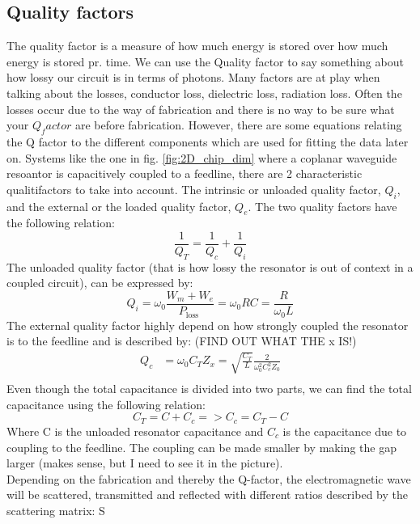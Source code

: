         \subsection{Quality factors}
        The quality factor is a measure of how much energy is stored over how much energy is stored pr. time. We can use the Quality factor to say something about how lossy our circuit is in terms of photons. Many factors are at play when talking about the losses, conductor loss, dielectric loss, radiation loss. Often the losses occur due to the way of fabrication and there is no way to be sure what your $Q_factor$ are before fabrication. However, there are some equations relating the Q factor to the different components which are used for fitting the data later on. Systems like the one in fig. \ref{fig:2D_chip_dim} where a coplanar waveguide resoantor is capacitively coupled to a feedline, there are 2 characteristic qualitifactors to take into account. The intrinsic or unloaded quality factor, $Q_i$, and the external or the loaded quality factor, $Q_e$. The two quality factors have the following relation:
        \begin{equation}
            \frac{1}{Q_{T}} = \frac{1}{Q_{c}} + \frac{1}{Q_{i}} 
        \end{equation}
        The unloaded quality factor (that is how lossy the resonator is out of context in a coupled circuit), can be expressed by: 
        \begin{equation}
            Q_i=\omega_0 \frac{W_m+W_e}{P_{\text {loss }}}=\omega_0 R C=\frac{R}{\omega_0 L}
        \end{equation}
        The external quality factor highly depend on how strongly coupled the resonator is to the feedline and is described by: (FIND OUT WHAT THE x IS!)
        \begin{equation}
            \begin{aligned}
                Q_c &= \omega_0 C_T Z_x=\sqrt{\frac{C_T}{L}} \frac{2}{\omega_0^2 C_c^2 Z_0}\\    
            \end{aligned} 
        \end{equation}\label{eq:Qc}
        Even though the total capacitance is divided into two parts, we can find the total capacitance using the following relation: 
        \begin{equation}
            C_{T} = C + C_{c} = > C_{c} = C_{T} - C
        \end{equation}
        Where C is the unloaded resonator capacitance and $C_c$ is the capacitance due to coupling to the feedline. The coupling can be made smaller by making the gap larger (makes sense, but I  need to see it in the picture). 
        \\
        Depending on the fabrication and thereby the Q-factor, the electromagnetic wave will be scattered, transmitted and reflected with different ratios described by the scattering matrix: S



